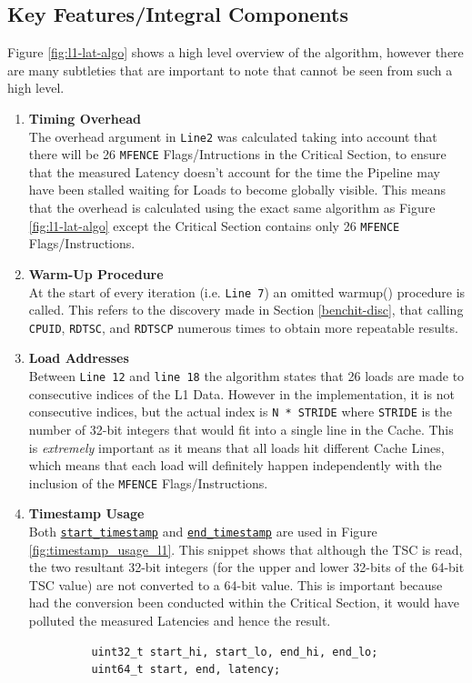 \documentclass[bsc,frontabs,twoside,singlespacing,parskip,deptreport]{infthesis}     %
\begin{document}
\subsection{Key Features/Integral Components}\label{sec:l1-lat-key-comp}
Figure \ref{fig:l1-lat-algo} shows a high level overview of the algorithm, however there are many subtleties that are important to note that cannot be seen from such a high level.
\begin{enumerate}
    \item{{\bf Timing Overhead} \\
    The overhead argument in \texttt{Line2} was calculated taking into account that there will be 26 \texttt{MFENCE} Flags/Intructions in the Critical Section, to ensure that the measured Latency doesn't account for the time the Pipeline may have been stalled waiting for Loads to become globally visible. This means that the overhead is calculated using the exact same algorithm as Figure \ref{fig:l1-lat-algo} except the Critical Section contains only 26 \texttt{MFENCE} Flags/Instructions.}\label{timing-overhead-consideration-L1}
    
    \item{{\bf Warm-Up Procedure} \\
    At the start of every iteration (i.e. \texttt{Line 7}) an omitted warmup() procedure is called. This refers to the discovery made in Section \ref{benchit-disc}, that calling \texttt{CPUID}, \texttt{RDTSC}, and \texttt{RDTSCP} numerous times to obtain more repeatable results. }
    
    \item{{\bf Load Addresses} \\
    Between \texttt{Line 12} and \texttt{line 18} the algorithm states that 26 loads are made to consecutive indices of the L1 Data. However in the implementation, it is not consecutive indices, but the actual index is \texttt{N * STRIDE} where \texttt{STRIDE} is the number of 32-bit integers that would fit into a single line in the Cache. This is \emph{extremely} important as it means that all loads hit different Cache Lines, which means that each load will definitely happen independently with the inclusion of the \texttt{MFENCE} Flags/Instructions.}
    
    \item{{\bf Timestamp Usage} \\
    Both \hyperref[fig:starttimestamp-code]{\texttt{start\_timestamp}} and \hyperref[fig:endtimestamp-code]{\texttt{end\_timestamp}} are used in Figure \ref{fig:timestamp_usage_l1}. This snippet shows that although the TSC is read, the two resultant 32-bit integers (for the upper and lower 32-bits of the 64-bit TSC value) are not converted to a 64-bit value. This is important because had the conversion been conducted within the Critical Section, it would have polluted the measured Latencies and hence the result.
    \begin{figure}[h!]
        \centering
        \begin{verbatim}
    uint32_t start_hi, start_lo, end_hi, end_lo;
    uint64_t start, end, latency;
    

\end{verbatim}
\end{figure}}
\end{enumerate}
\end{document}
